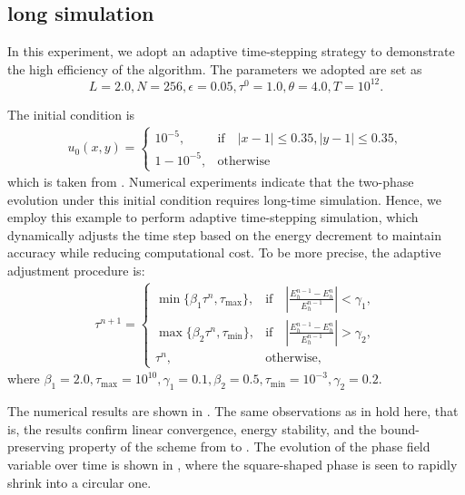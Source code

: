 \iffalse 
\subsection{long simulation}\label{subsec:Adaptive}
In this experiment, we adopt an adaptive time-stepping strategy to demonstrate the high efficiency of the algorithm. 
The parameters we adopted are set as
\begin{equation}
L=2.0, N=256,\epsilon = 0.05, \tau^0=1.0,\theta=4.0, T=10^{12}.
\end{equation}
\par The initial condition is
\begin{align}
u_0(x,y)=
\begin{cases}
    10^{-5},&\text{if}\quad |x-1|\leq 0.35, |y-1|\leq 0.35,\\
    1-10^{-5},&\text{otherwise}
\end{cases}
\end{align}
which is taken from \cite{wang2020stabilized}.
Numerical experiments indicate that the two-phase evolution under this initial condition requires long-time simulation. 
Hence, we employ this example to perform adaptive time-stepping simulation, 
which dynamically adjusts the time step based on the energy decrement to maintain accuracy while reducing computational cost.
To be more precise, the adaptive adjustment procedure is:
\begin{align}
\tau^{n+1}=
\begin{cases}
\min \{\beta_1 \tau^{n},\tau_{\max}\},&\text{if} \quad |\frac{E_h^{n-1}-E_h^n}{E_h^{n-1}}|<\gamma_1,\\
\max \{\beta_2 \tau^{n},\tau_{\min}\},&\text{if} \quad |\frac{E_h^{n-1}-E_h^n}{E_h^{n-1}}|>\gamma_2,\\
\tau^n,&\text{otherwise},
\end{cases}
\end{align}
where $\beta_1=2.0,\tau_{\max}=10^{10},\gamma_1=0.1,\beta_2=0.5,\tau_{\min}=10^{-3},\gamma_2=0.2$.
\par The numerical results are shown in . 
The same observations as in  hold here, that is, 
the results confirm linear convergence, energy stability, and the bound-preserving property of the scheme from  to .
The evolution of the phase field variable over time is shown in , where the square-shaped phase is seen to rapidly shrink into a circular one.


